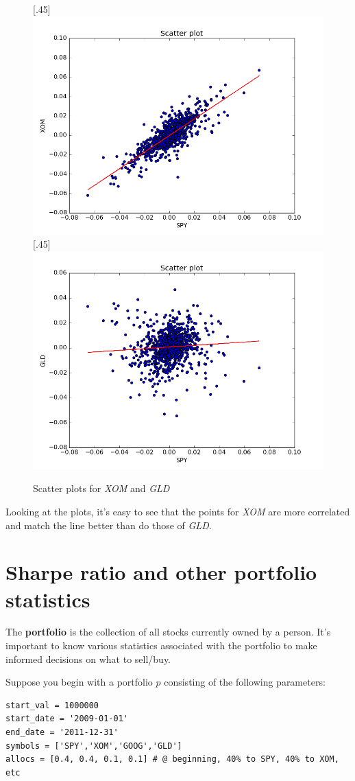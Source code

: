 \begin{figure}[h!]
	\centering
    [.45\linewidth]{
    	\includegraphics[width=.5\linewidth]{images/scatter_XOM.png}
    }
    [.45\linewidth]{
    	\includegraphics[width=.5\linewidth]{images/scatter_GLD.png}
    }
    \caption{Scatter plots for \textit{XOM} and \textit{GLD}}
\end{figure}
\newpage

\noindent Looking at the plots, it's easy to see that the points for \textit{XOM} are more correlated and match the line better than do those of \textit{GLD}.

\section{Sharpe ratio and other portfolio statistics}

\noindent The \textbf{portfolio} is the collection of all stocks currently owned by a person. It's important to know various statistics associated with the portfolio to make informed decisions on what to sell/buy.

\noindent Suppose you begin with a portfolio $p$ consisting of the following parameters:
\begin{lstlisting}[style=python]
start_val = 1000000
start_date = '2009-01-01'
end_date = '2011-12-31'
symbols = ['SPY','XOM','GOOG','GLD']
allocs = [0.4, 0.4, 0.1, 0.1] # @ beginning, 40% to SPY, 40% to XOM, etc
\end{lstlisting}


